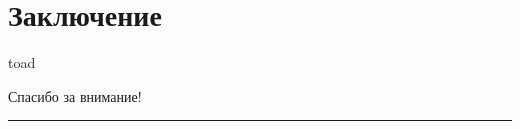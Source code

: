 









\section{Заключение}
\begin{custom-bg-frame}{toad}
\end{custom-bg-frame}

\begin{bg-frame}
  \vspace{2.0\baselineskip}
  {\huge Спасибо за внимание!}\\
  \rule{180pt}{}\\
  \insertauthor{} \insertcontacts{}\\
  \vspace{0.25\baselineskip}
  \inserthomepage{}
\end{bg-frame}


